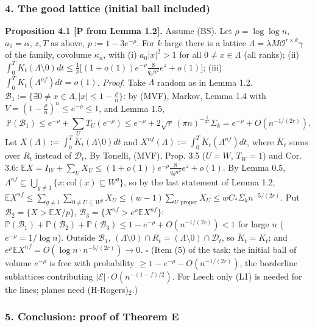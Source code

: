 \hypertarget{the-good-lattice-initial-ball-included}{%
\subsubsection*{4. The good lattice (initial ball included)}\label{the-good-lattice-initial-ball-included}}

\textbf{Proposition 4.1 {[}P from Lemma 1.2{]}.} Assume (BS). Let \(\rho=\log\log n\), \(a_0=\alpha\), \(z,T\) as above, \(p:=1-3e^{-\rho}\). For \(k\) large there is a lattice \(\Lambda=\lambda M\mathcal O^{r\times k}\gamma\) of the family, covolume \(\kappa_n\), with (i) \(a_0|x|^2>1\) for all \(0\ne x\in\Lambda\) (all ranks); (ii) \(\int_0^TK_t(\Lambda\setminus0)dt\le\frac1p\big[(1+o(1))e^{-\rho}\frac8{q_0n^2}e^z+o(1)\big]\); (iii) \(\int_0^TK_t(\Lambda^{nf})dt=o(1)\).
\emph{Proof.} Take \(\Lambda\) random as in Lemma 1.2. \(\mathcal B_1:=\{\exists0\ne x\in\Lambda,|x|\le1-\frac\rho n\}\): by (MVF), Markov, Lemma 1.4 with \(V=(1-\frac\rho n)^n\le e^{-\rho}\le1\), and Lemma 1.5,
\[\mathbb P(\mathcal B_1)\le e^{-\rho}+\sum_UT_U(e^{-\rho})\le e^{-\rho}+2\sqrt r\,(\pi n)^{-\frac1{2r}}\Sigma_k=e^{-\rho}+O(n^{-1/(2r)}).\]
Let \(X(\Lambda):=\int_0^T\tilde K_t(\Lambda\setminus0)dt\) and \(X^{nf}(\Lambda):=\int_0^T\tilde K_t(\Lambda^{nf})dt\), where \(\tilde K_t\) sums over \(R_t\) instead of \(\mathcal D_t\). By Tonelli, (MVF), Prop. 3.5 (\(U=W\), \(T_W=1\)) and Cor. 3.6: \(\mathbb EX=I_W+\sum_UX_U\le(1+o(1))e^{-\rho}\frac8{q_0n^2}e^z+o(1)\). By Lemma 0.5, \(\Lambda^{nf}\subseteq\bigcup_{g\ne1}\{x:\mathrm{col}(x)\subseteq W^g\}\), so by the last statement of Lemma 1.2, \(\mathbb EX^{nf}\le\sum_{g\ne1}\sum_{0\ne U\subseteq W^g}X_U\le(w-1)\sum_{U\text{ proper}}X_U\le wC_*\Sigma_kn^{-5/(2r)}\). Put \(\mathcal B_2=\{X>\mathbb EX/p\}\), \(\mathcal B_3=\{X^{nf}>e^\rho\mathbb EX^{nf}\}\): \(\mathbb P(\mathcal B_1)+\mathbb P(\mathcal B_2)+\mathbb P(\mathcal B_3)\le1-e^{-\rho}+O(n^{-1/(2r)})<1\) for large \(n\) (\(e^{-\rho}=1/\log n\)). Outside \(\mathcal B_1\), \((\Lambda\setminus0)\cap R_t=(\Lambda\setminus0)\cap\mathcal D_t\), so \(\tilde K_t=K_t\); and \(e^\rho\mathbb EX^{nf}=O(\log n\cdot n^{-5/(2r)})\to0\). \(\square\)
(Item (5) of the task: the initial ball of volume \(e^{-\rho}\) is free with probability \(\ge1-e^{-\rho}-O(n^{-1/(2r)})\), the borderline sublattices contributing \(|\mathcal E|\cdot O(n^{-(1-f)/2})\). For Leech only (L1) is needed for the lines; planes need (H-Rogers)\(_2\).)

\hypertarget{conclusion-proof-of-theorem-e}{%
\subsubsection*{5. Conclusion: proof of Theorem E}\label{conclusion-proof-of-theorem-e}}

